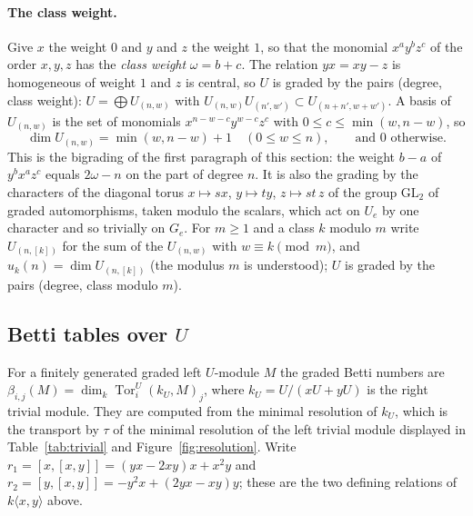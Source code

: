 \documentclass[11pt]{article}
\theoremstyle{definition}
\theoremstyle{remark}
\newcommand{\Tor}{\operatorname{Tor}}
\begin{document}
\paragraph{The class weight.} Give $x$ the weight $0$ and $y$ and $z$ the weight $1$, so that the monomial $x^ay^bz^c$ of the order $x,y,z$ has the \emph{class weight} $\omega=b+c$. The relation $yx=xy-z$ is homogeneous of weight $1$ and $z$ is central, so $U$ is graded by the pairs (degree, class weight): $U=\bigoplus U_{(n,w)}$ with $U_{(n,w)}U_{(n',w')}\subset U_{(n+n',w+w')}$. A basis of $U_{(n,w)}$ is the set of monomials $x^{n-w-c}y^{w-c}z^c$ with $0\le c\le\min(w,n-w)$, so
\begin{equation}\label{eq:dimnw}
\dim U_{(n,w)}=\min(w,n-w)+1\quad(0\le w\le n),\qquad\text{and }0\text{ otherwise.}
\end{equation}
This is the bigrading of the first paragraph of this section: the weight $b-a$ of $y^bx^az^c$ equals $2\omega-n$ on the part of degree $n$. It is also the grading by the characters of the diagonal torus $x\mapsto sx$, $y\mapsto ty$, $z\mapsto st\,z$ of the group $\mathrm{GL}_2$ of graded automorphisms, taken modulo the scalars, which act on $U_e$ by one character and so trivially on $G_e$. For $m\ge1$ and a class $k$ modulo $m$ write $U_{(n,[k])}$ for the sum of the $U_{(n,w)}$ with $w\equiv k\pmod m$, and $u_k(n)=\dim U_{(n,[k])}$ (the modulus $m$ is understood); $U$ is graded by the pairs (degree, class modulo $m$).

\subsection{Betti tables over \texorpdfstring{$U$}{U}}
\label{sec:bettiU}

For a finitely generated graded left $U$-module $M$ the graded Betti numbers are $\beta_{i,j}(M)=\dim_k\Tor_i^U(k_U,M)_j$, where $k_U=U/(xU+yU)$ is the right trivial module. They are computed from the minimal resolution of $k_U$, which is the transport by $\tau$ of the minimal resolution of the left trivial module displayed in Table~\ref{tab:trivial} and Figure~\ref{fig:resolution}. Write $r_1=[x,[x,y]]=(yx-2xy)x+x^2y$ and $r_2=[y,[x,y]]=-y^2x+(2yx-xy)y$; these are the two defining relations of $k\langle x,y\rangle$ above.

\begin{table}[htbp]
\centering\footnotesize

\caption{The minimal graded free resolution of the left trivial module $k=U/(Ux+Uy)$ over $U$: free module, degree of its generators and the matrix of the map to the previous position; the Betti table of $k$ is $(1,2,2,1)$ on $(0,1,3,4)$.}
\label{tab:trivial}
\end{table}
\end{document}
